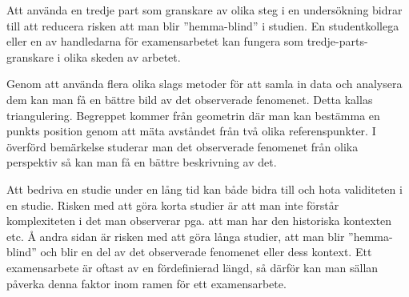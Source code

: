 Att använda en tredje part som granskare av olika steg i en undersökning
bidrar till att reducera risken att man blir ''hemma-blind'' i studien.
En studentkollega eller en av handledarna för examensarbetet kan fungera
som tredje-parts-granskare i olika skeden av arbetet.

Genom att använda flera olika slags metoder för att samla in data och
analysera dem kan man få en bättre bild av det observerade fenomenet.
Detta kallas triangulering. Begreppet kommer från geometrin där man kan
bestämma en punkts position genom att mäta avståndet från två olika
referenspunkter. I överförd bemärkelse studerar man det observerade
fenomenet från olika perspektiv så kan man få en bättre beskrivning av
det.

Att bedriva en studie under en lång tid kan både bidra till och hota
validiteten i en studie. Risken med att göra korta studier är att man
inte förstår komplexiteten i det man observerar pga. att man har den
historiska kontexten etc. Å andra sidan är risken med att göra långa
studier, att man blir ''hemma-blind'' och blir en del av det observerade
fenomenet eller dess kontext. Ett examensarbete är oftast av en
fördefinierad längd, så därför kan man sällan påverka denna faktor inom
ramen för ett examensarbete.
